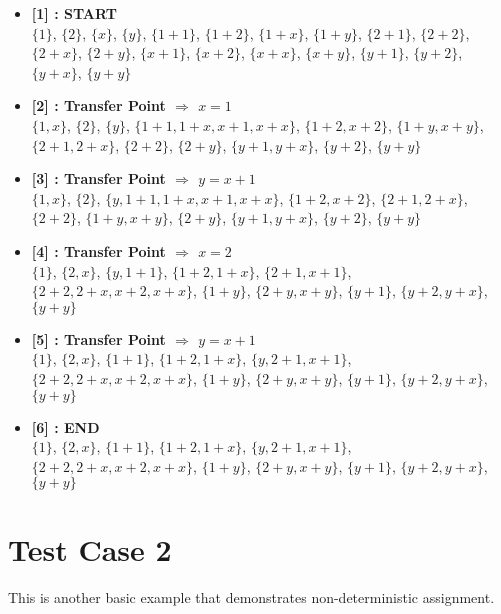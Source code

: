 \begin{itemize}

    \item \textbf{[1] : START}\\
        $\{1\}$, $\{2\}$, $\{x\}$, $\{y\}$, $\{1 + 1\}$, $\{1 + 2\}$, $\{1 + x\}$, $\{1 + y\}$, $\{2 + 1\}$, $\{2 + 2\}$, $\{2 + x\}$, $\{2 + y\}$, $\{x + 1\}$, $\{x + 2\}$, $\{x + x\}$, $\{x + y\}$, $\{y + 1\}$, $\{y + 2\}$, $\{y + x\}$, $\{y + y\}$

    \item \textbf{[2] : Transfer Point $\Rightarrow$ $x = 1$}\\
        $\{1, x\}$, $\{2\}$, $\{y\}$, $\{1 + 1, 1 + x, x + 1, x + x\}$, $\{1 + 2, x + 2\}$, $\{1 + y, x + y\}$, $\{2 + 1, 2 + x\}$, $\{2 + 2\}$, $\{2 + y\}$, $\{y + 1, y + x\}$, $\{y + 2\}$, $\{y + y\}$

    \item \textbf{[3] : Transfer Point $\Rightarrow$ $y = x + 1$}\\
        $\{1, x\}$, $\{2\}$, $\{y, 1 + 1, 1 + x, x + 1, x + x\}$, $\{1 + 2, x + 2\}$, $\{2 + 1, 2 + x\}$, $\{2 + 2\}$, $\{1 + y, x + y\}$, $\{2 + y\}$, $\{y + 1, y + x\}$, $\{y + 2\}$, $\{y + y\}$

    \item \textbf{[4] : Transfer Point $\Rightarrow$ $x = 2$}\\
        $\{1\}$, $\{2, x\}$, $\{y, 1 + 1\}$, $\{1 + 2, 1 + x\}$, $\{2 + 1, x + 1\}$, $\{2 + 2, 2 + x, x + 2, x + x\}$, $\{1 + y\}$, $\{2 + y, x + y\}$, $\{y + 1\}$, $\{y + 2, y + x\}$, $\{y + y\}$

    \item \textbf{[5] : Transfer Point $\Rightarrow$ $y = x + 1$}\\
        $\{1\}$, $\{2, x\}$, $\{1 + 1\}$, $\{1 + 2, 1 + x\}$, $\{y, 2 + 1, x + 1\}$, $\{2 + 2, 2 + x, x + 2, x + x\}$, $\{1 + y\}$, $\{2 + y, x + y\}$, $\{y + 1\}$, $\{y + 2, y + x\}$, $\{y + y\}$

    \item \textbf{[6] : END}\\
        $\{1\}$, $\{2, x\}$, $\{1 + 1\}$, $\{1 + 2, 1 + x\}$, $\{y, 2 + 1, x + 1\}$, $\{2 + 2, 2 + x, x + 2, x + x\}$, $\{1 + y\}$, $\{2 + y, x + y\}$, $\{y + 1\}$, $\{y + 2, y + x\}$, $\{y + y\}$

\end{itemize}

\section{Test Case 2}
\label{sec:tc2}
This is another basic example that demonstrates non-deterministic assignment.


